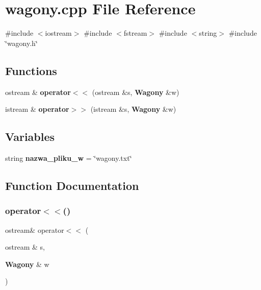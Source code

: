 \section{wagony.\+cpp File Reference}
\label{wagony_8cpp}
{\ttfamily \#include $<$iostream$>$}\newline
{\ttfamily \#include $<$fstream$>$}\newline
{\ttfamily \#include $<$string$>$}\newline
{\ttfamily \#include \char`\"{}wagony.\+h\char`\"{}}\newline
\subsection*{Functions}
\begin{DoxyCompactItemize}
\item 
ostream \& \textbf{ operator$<$$<$} (ostream \&s, \textbf{ Wagony} \&w)
\item 
istream \& \textbf{ operator$>$$>$} (istream \&s, \textbf{ Wagony} \&w)
\end{DoxyCompactItemize}
\subsection*{Variables}
\begin{DoxyCompactItemize}
\item 
string \textbf{ nazwa\+\_\+pliku\+\_\+w} = \char`\"{}wagony.\+txt\char`\"{}
\end{DoxyCompactItemize}


\subsection{Function Documentation}
\mbox{\label{wagony_8cpp_a1829f200bc2533d2cc98ec9e17e2174e}} 
\subsubsection{operator$<$$<$()}
{\footnotesize\ttfamily ostream\& operator$<$$<$ (\begin{DoxyParamCaption}\item[{ostream \&}]{s,  }\item[{\textbf{ Wagony} \&}]{w }\end{DoxyParamCaption})}

\mbox{\label{wagony_8cpp_a55e031de3cc9ab883ab9356fda851f11}} 
